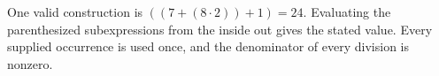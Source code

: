 One valid construction is $\boxed{((7+(8\cdot 2))+1)=24}$. Evaluating the parenthesized subexpressions from the inside out gives the stated value. Every supplied occurrence is used once, and the denominator of every division is nonzero.
